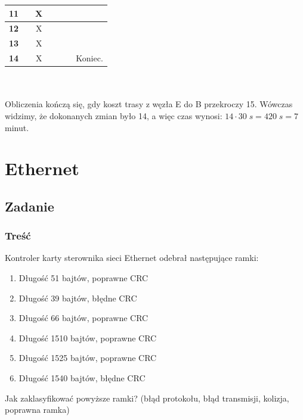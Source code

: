 \documentclass[a4paper,twoside]{article}
\begin{document}
\begin{tabular}{|c|c|c|c|c|c|p{7cm}|}
	\hline \textbf{11} & \color{red}{12} & X & \color{red}{12} & \color{red}{12} & \color{red}{12} &  \\ 
	\hline \textbf{12} & \color{red}{13} & X & \color{red}{13} & \color{red}{13} & \color{red}{13} &  \\ 
	\hline \textbf{13} & \color{red}{14} & X & \color{red}{14} & \color{red}{14} & \color{red}{14} &  \\ 
	\hline \textbf{14} & \color{red}{15} & X & \color{red}{15} & \color{red}{15} & \color{red}{15} &  Koniec. \\
	\hline 
\end{tabular}\\\\
Obliczenia kończą się, gdy koszt trasy z węzła E do B przekroczy 15. Wówczas widzimy, że dokonanych zmian było 14, a więc czas wynosi: $ 14\cdot 30\;s=420\;s=7$ minut.

\section{Ethernet}
\subsection{Zadanie}
\subsubsection{Treść}
Kontroler karty sterownika sieci Ethernet odebrał następujące ramki:
\begin{enumerate}
	\item Długość 51 bajtów, poprawne CRC
	\item Długość 39 bajtów, błędne CRC
	\item Długość 66 bajtów, poprawne CRC
	\item Długość 1510 bajtów, poprawne CRC
	\item Długość 1525 bajtów, poprawne CRC
	\item Długość 1540 bajtów, błędne CRC
\end{enumerate}
Jak zaklasyfikować powyższe ramki? (błąd protokołu, błąd transmisji, kolizja, poprawna ramka)
\end{document}

